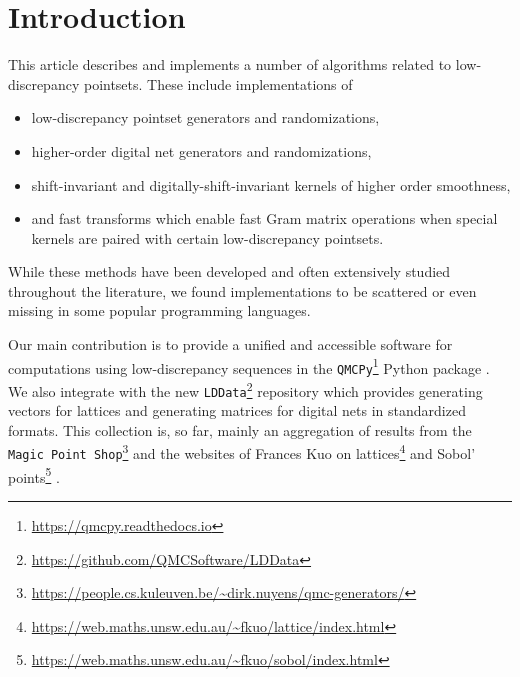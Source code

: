 \documentclass[acmsmall]{acmart}
\newcommand{\FJHNote}[1]{\textcolor{blue}{#1}}
\begin{document}

\maketitle

\section{Introduction}

This article describes and implements a number of algorithms related to low-discrepancy pointsets. These include implementations of
\begin{itemize}
    \item low-discrepancy pointset generators and randomizations,
    \item higher-order digital net generators and randomizations, 
    \item shift-invariant and digitally-shift-invariant kernels of higher order smoothness,
    \item and fast transforms which enable fast Gram matrix operations when special kernels are paired with certain low-discrepancy pointsets. 
\end{itemize}
While these methods have been developed and often extensively studied throughout the literature, we found implementations to be scattered or even missing in some popular programming languages. 

Our main contribution is to provide a unified and accessible software for computations using low-discrepancy sequences in the \texttt{QMCPy}\footnote{\url{https://qmcpy.readthedocs.io}} Python package \citep{choi.QMC_software,choi.challenges_great_qmc_software}.  We also integrate with the new \texttt{LDData}\footnote{\url{https://github.com/QMCSoftware/LDData}} repository which provides generating vectors for lattices and generating matrices for digital nets in standardized formats. This collection is, so far, mainly an aggregation of results from the \texttt{Magic Point Shop}\footnote{\url{https://people.cs.kuleuven.be/~dirk.nuyens/qmc-generators/}} \citep{MPS} and the websites of Frances Kuo on lattices\footnote{\url{https://web.maths.unsw.edu.au/~fkuo/lattice/index.html}} \citep{cools2006constructing,nuyens2006fast} and Sobol' points\footnote{\url{https://web.maths.unsw.edu.au/~fkuo/sobol/index.html}} \citep{joe2003remark,joe2008constructing}.
\end{document}
